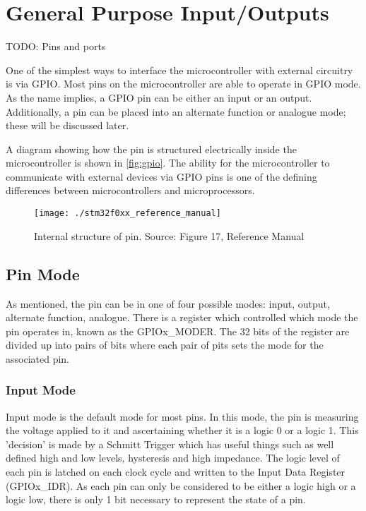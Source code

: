 \chapter{General Purpose Input/Outputs}

TODO: Pins and ports

One of the simplest ways to interface the microcontroller with external circuitry is via GPIO. Most pins on the microcontroller are able to operate in GPIO mode. As the name implies, a GPIO pin can be either an input or an output. Additionally, a pin can be placed into an alternate function or analogue mode; these will be discussed later.

A diagram showing how the pin is structured electrically inside the microcontroller is shown in \autoref{fig:gpio}. The ability for the microcontroller to communicate with external devices via GPIO pins is one of the defining differences between microcontrollers and microprocessors.

\begin{figure}
\centering
\texttt{[image: ./stm32f0xx\_reference\_manual]}
\caption{Internal structure of pin. Source: Figure 17, Reference Manual}
\label{fig:gpio}
\end{figure}


\section{Pin Mode}
As mentioned, the pin can be in one of four possible modes: input, output, alternate function, analogue. There is a register which controlled which mode the pin operates in, known as the GPIOx\_MODER. The 32 bits of the register are divided up into pairs of bits where each pair of pits sets the mode for the associated pin. 

\subsection{Input Mode}
Input mode is the default mode for most pins. In this mode, the pin is measuring the voltage applied to it and ascertaining whether it is a logic 0 or a logic 1. This 'decision' is made by a Schmitt Trigger which has useful things such as well defined high and low levels, hysteresis and high impedance. The logic level of each pin is latched on each clock cycle and written to the Input Data Register (GPIOx\_IDR). As each pin can only be considered to be either a logic high or a logic low, there is only 1 bit necessary to represent the state of a pin.

